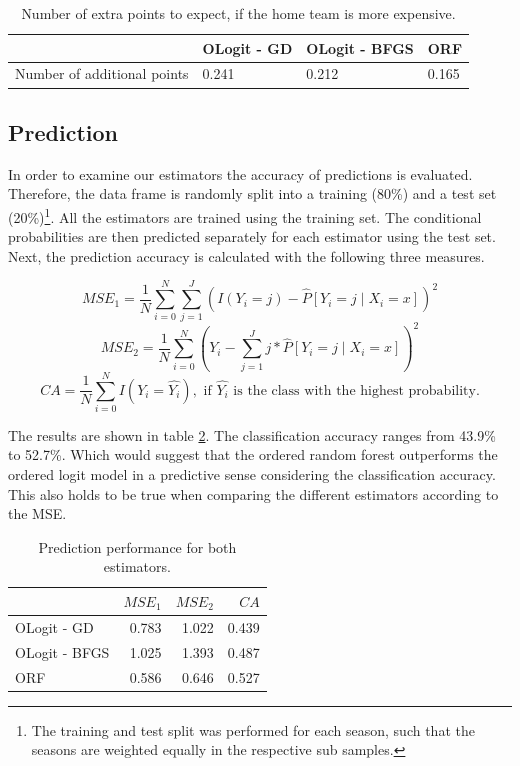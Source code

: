 \documentclass[11pt]{article}
\begin{document}
\begin{table}[ht]
\centering
	\begin{tabular}{llll}
	\toprule
	{} &    OLogit - GD & OLogit - BFGS & ORF \\
	\midrule
	Number of additional points & 0.241 & 0.212 &  0.165 \\
	\bottomrule
	\end{tabular}
	\caption{Number of extra points to expect, if the home team is more expensive.}
	\label{tab:numpoints}
\end{table}


\subsection{Prediction}

In order to examine our estimators the accuracy of predictions is evaluated. Therefore, the data frame is randomly split into a training (80\%) and a test set (20\%)\footnote{The training and test split was performed for each season, such that the seasons are weighted equally in the respective sub samples.}. All the estimators are trained using the training set. The conditional probabilities are then predicted separately for each estimator using the test set. Next, the prediction accuracy is calculated with the following three measures.

$$MSE_1 = \frac{1}{N} \sum_{i = 0}^N \sum_{j=1}^J (I(Y_i = j) - \hat{P}[Y_i = j \mid X_i = x])^2$$
$$MSE_2 = \frac{1}{N} \sum_{i = 0}^N (Y_i  - \sum_{j=1}^J j * \hat{P}[Y_i = j \mid X_i = x])^2$$
$$CA = \frac{1}{N} \sum_{i = 0}^N I(Y_i  = \hat{Y_i}) , \text{ if } \hat{Y_i} \text{ is the class with the highest probability.}$$

The results are shown in table \ref{tab:predictions}. The classification accuracy ranges from 43.9\% to 52.7\%. Which would suggest that the ordered random forest outperforms the ordered logit model in a predictive sense considering the classification accuracy. This also holds to be true when comparing the different estimators according to the MSE.

\begin{table}[ht]
\centering
	\begin{tabular}{lrrr} \toprule {}
	  &     $MSE_1$ &  $ MSE_2$ & $CA$ \\
	  \midrule
	OLogit - GD &   0.783 & 1.022 & 0.439 \\
	OLogit - BFGS &   1.025 & 1.393 & 0.487 \\
	ORF &     0.586  & 0.646 & 0.527 \\  \midrule
	\bottomrule
	\end{tabular}
\caption{Prediction performance for both estimators.}
\label{tab:predictions}
\end{table}
\end{document}
